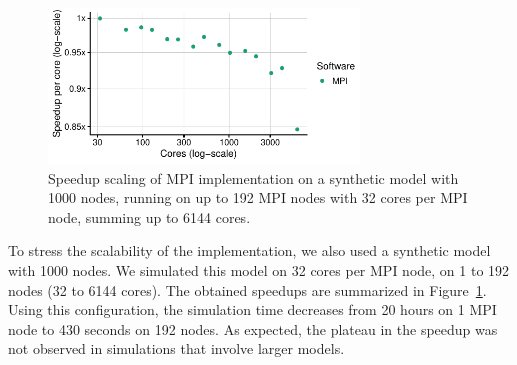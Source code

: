 \documentclass[sn-mathphys-num]{sn-jnl}%
\begin{document}
\begin{figure}%
\centering
\includegraphics[width=3.25in]{plots/synth_mpi_speedup.pdf}
\caption{Speedup scaling of MPI implementation on a synthetic model with 1000 nodes, running on up to 192 MPI nodes with 32 cores per MPI node, summing up to 6144 cores.}
\label{fig:synthetic_results}
\end{figure}

To stress the scalability of the implementation, we also used a synthetic model with 1000 nodes. We simulated this model on 32 cores per MPI node, on 1 to 192 nodes (32 to 6144 cores). The obtained speedups are summarized in Figure~\ref{fig:synthetic_results}. Using this configuration, the simulation time decreases from 20 hours on 1 MPI node to 430 seconds on 192 nodes. As expected, the plateau in the speedup was not observed in simulations that involve larger models.



\end{document}
